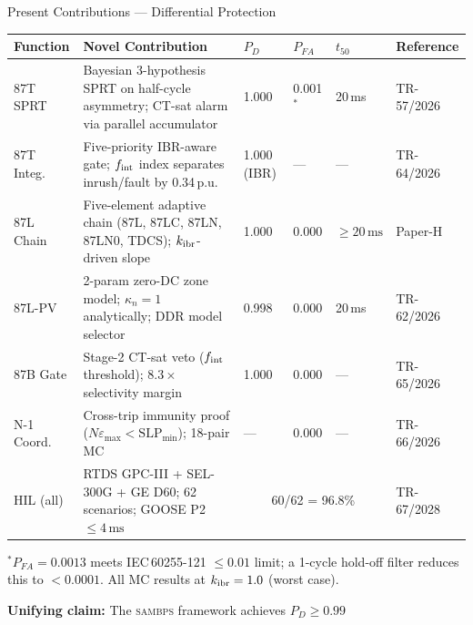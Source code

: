\documentclass[aspectratio=169, 10pt]{beamer}
\newcommand{\SAMBPS}{\textsc{sambps}}
\newcommand{\ms}{\,\text{ms}}
\newcommand{\kIBR}{k_{\rm ibr}}
\newcommand{\kn}{\kappa_n}
\newcommand{\PD}{P_D}
\newcommand{\PFA}{P_{FA}}
\begin{document}
\begin{frame}{Present Contributions — Differential Protection}
\vspace{-2pt}
\begin{center}
\footnotesize
\begin{tabular}{@{}p{1.1cm}p{3.9cm}p{2.0cm}p{2.0cm}p{1.4cm}p{2.4cm}@{}}
  \toprule
  \textbf{Function} & \textbf{Novel Contribution} &
  \textbf{$\PD$} & \textbf{$\PFA$} &
  \textbf{$t_{50}$} & \textbf{Reference}\\
  \midrule
  \rowcolor{lightblue!60}
  87T SPRT    & Bayesian 3-hypothesis SPRT on half-cycle asymmetry; CT-sat alarm via parallel accumulator
               & 1.000 & 0.001$^*$ & 20\,ms & TR-57/2026\\
  \rowcolor{lightblue!40}
  87T Integ.  & Five-priority IBR-aware gate; $f_{\rm int}$ index separates inrush/fault by 0.34\,p.u.
               & 1.000 (IBR) & --- & --- & TR-64/2026\\
  \rowcolor{lightgreen!60}
  87L Chain   & Five-element adaptive chain (87L, 87LC, 87LN, 87LN0, TDCS); $\kIBR$-driven slope
               & 1.000 & 0.000 & $\geq\!20\ms$ & Paper-H\\
  \rowcolor{lightgreen!40}
  87L-PV      & 2-param zero-DC zone model; $\kn=1$ analytically; DDR model selector
               & 0.998 & 0.000 & 20\,ms & TR-62/2026\\
  \rowcolor{lightorange!60}
  87B Gate    & Stage-2 CT-sat veto ($f_{\rm int}$ threshold); $8.3\times$ selectivity margin
               & 1.000 & 0.000 & --- & TR-65/2026\\
  \rowcolor{lightgray}
  N-1 Coord.  & Cross-trip immunity proof ($N\varepsilon_{\max} < \mathrm{SLP}_{\min}$); 18-pair MC
               & --- & 0.000 & --- & TR-66/2026\\
  \rowcolor{lightyellow}
  HIL (all)   & RTDS GPC-III + SEL-300G + GE D60; 62 scenarios; GOOSE P2 $\leq\!4\ms$
               & \multicolumn{3}{c}{60/62 = 96.8\%} & TR-67/2028\\
  \bottomrule
\end{tabular}
\end{center}
\vspace{2pt}
{\scriptsize $^*P_{FA}=0.0013$ meets IEC\,60255-121 $\leq 0.01$ limit;
a 1-cycle hold-off filter reduces this to $< 0.0001$.
All MC results at $\kIBR = 1.0$ (worst case).}
\vspace{4pt}
\begin{tcolorbox}[keybox]
\small
\textbf{Unifying claim:} The \SAMBPS{} framework achieves $\PD \geq 0.99$

\end{tcolorbox}
\end{frame}
\end{document}

